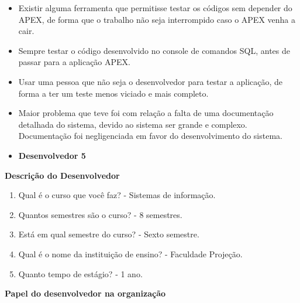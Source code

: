 \begin{apendicesenv}
\begin{itemize}
	\item Existir alguma ferramenta que permitisse testar os códigos sem depender do APEX, de forma que o trabalho não seja interrompido caso o APEX venha a cair.
	\item Sempre testar o código desenvolvido no console de comandos SQL, antes de passar para a aplicação APEX.
	\item Usar uma pessoa que não seja o desenvolvedor para testar a aplicação, de forma a ter um teste menos viciado e mais completo.
	\item Maior problema que teve foi com relação a falta de uma documentação detalhada do sistema, devido ao sistema ser grande e complexo. Documentação foi negligenciada em favor do desenvolvimento do sistema.
\end{itemize}



\begin{itemize}
	\item \textbf{Desenvolvedor 5}
\end{itemize}

\textbf{Descrição do Desenvolvedor}

\begin{enumerate}
	\item Qual é o curso que você faz?\newline
	- Sistemas de informação.
	\item Quantos semestres são o curso?\newline
	- 8 semestres.
	\item Está em qual semestre do curso?\newline
	- Sexto semestre.
	\item Qual é o nome da instituição de ensino?\newline
	- Faculdade Projeção.
	\item Quanto tempo de estágio?\newline
	- 1 ano.
\end{enumerate}

\textbf{Papel do desenvolvedor na organização}


\end{apendicesenv}
